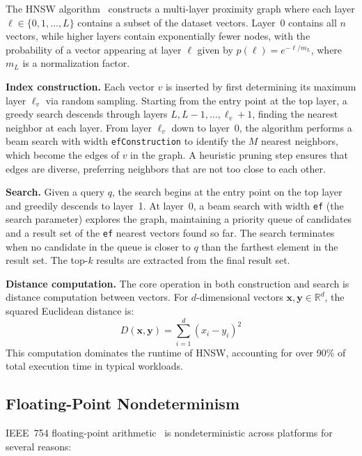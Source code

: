 \documentclass[10pt,journal]{IEEEtran}
\newcommand{\hnsw}{\textsc{HNSW}}
\begin{document}
The \hnsw{} algorithm~\cite{malkov2020hnsw} constructs a multi-layer proximity graph where each layer $\ell \in \{0, 1, \ldots, L\}$ contains a subset of the dataset vectors. Layer~0 contains all $n$ vectors, while higher layers contain exponentially fewer nodes, with the probability of a vector appearing at layer $\ell$ given by $p(\ell) = e^{-\ell / m_L}$, where $m_L$ is a normalization factor.

\textbf{Index construction.} Each vector $v$ is inserted by first determining its maximum layer $\ell_v$ via random sampling. Starting from the entry point at the top layer, a greedy search descends through layers $L, L{-}1, \ldots, \ell_v{+}1$, finding the nearest neighbor at each layer. From layer $\ell_v$ down to layer~0, the algorithm performs a beam search with width \texttt{efConstruction} to identify the $M$ nearest neighbors, which become the edges of $v$ in the graph. A heuristic pruning step ensures that edges are diverse, preferring neighbors that are not too close to each other.

\textbf{Search.} Given a query $q$, the search begins at the entry point on the top layer and greedily descends to layer~1. At layer~0, a beam search with width \texttt{ef} (the search parameter) explores the graph, maintaining a priority queue of candidates and a result set of the \texttt{ef} nearest vectors found so far. The search terminates when no candidate in the queue is closer to $q$ than the farthest element in the result set. The top-$k$ results are extracted from the final result set.

\textbf{Distance computation.} The core operation in both construction and search is distance computation between vectors. For $d$-dimensional vectors $\mathbf{x}, \mathbf{y} \in \mathbb{R}^d$, the squared Euclidean distance is:
\begin{equation}
  \label{eq:l2dist}
  D(\mathbf{x}, \mathbf{y}) = \sum_{i=1}^{d} (x_i - y_i)^2
\end{equation}
This computation dominates the runtime of \hnsw{}, accounting for over 90\% of total execution time in typical workloads.

\subsection{Floating-Point Nondeterminism}
\label{sec:fp_nondet}

IEEE~754 floating-point arithmetic~\cite{goldberg1991float} is nondeterministic across platforms for several reasons:
\end{document}
